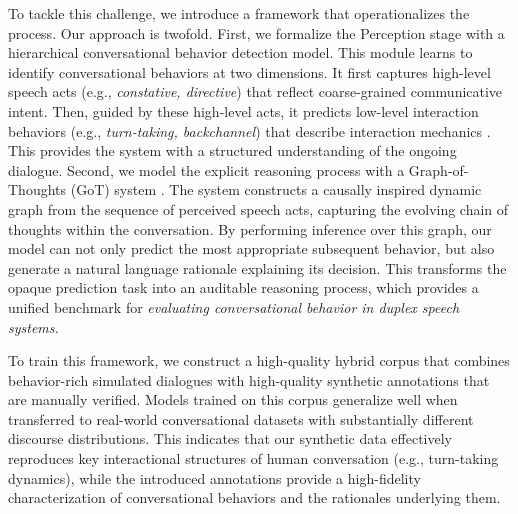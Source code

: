 To tackle this challenge, we introduce a framework that operationalizes the process. Our approach is twofold. First, we formalize the Perception stage with a hierarchical conversational behavior detection model. This module learns to identify conversational behaviors at two dimensions. It first captures high-level speech acts (e.g., {\em constative, directive}) \citep{jurafsky2025speech} that reflect coarse-grained communicative intent. Then, guided by these high-level acts, it predicts low-level interaction behaviors (e.g., {\em turn-taking, backchannel}) that describe interaction mechanics \citep{schegloff1982discourse, gravano2011turn, duncan1972some, raux2012optimizing, khouzaimi2016reinforcement, marge2022spoken, arxiv:2503.04721, arxiv:2503.01174, dgslm}. This provides the system with a structured understanding of the ongoing dialogue. Second, we model the explicit reasoning process with a Graph-of-Thoughts (GoT) system \citep{got}. The system constructs a causally inspired dynamic graph from the sequence of perceived speech acts, capturing the evolving chain of thoughts within the conversation. By performing inference over this graph, our model can not only predict the most appropriate subsequent behavior, but also generate a natural language rationale explaining its decision. This transforms the opaque prediction task into an auditable reasoning process, which provides a unified benchmark for \textit{evaluating conversational behavior in duplex speech systems.}

To train this framework, we construct a high-quality hybrid corpus that combines behavior-rich simulated dialogues with high-quality synthetic annotations that are manually verified. Models trained on this corpus generalize well when transferred to real-world conversational datasets with substantially different discourse distributions. This indicates that our synthetic data effectively reproduces key interactional structures of human conversation (e.g., turn-taking dynamics), while the introduced annotations provide a high-fidelity characterization of conversational behaviors and the rationales underlying them.


